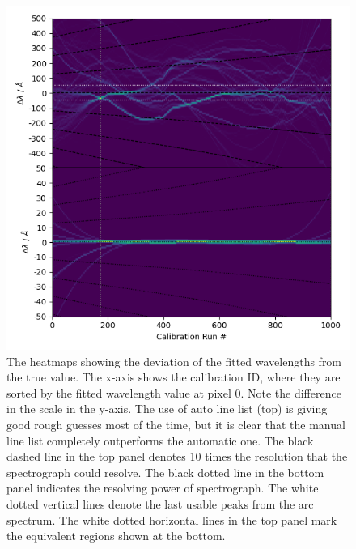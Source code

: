\documentclass[fleqn,usenatbib]{rasti}
\begin{document}
\begin{figure}[h]
    \centering
    \includegraphics[width=\columnwidth]{plots/figure_5_heatmap.png}
    \caption{The heatmaps showing the deviation of the fitted wavelengths from the
    true value. The x-axis shows the calibration ID, where they are sorted by the
    fitted wavelength value at pixel 0. Note the difference in the scale in the y-axis.
    The use of auto line list (top) is giving good rough guesses most of the time,
    but it is clear that the manual line list completely outperforms the automatic
    one. The black dashed line in the top panel denotes 10 times the resolution that
    the spectrograph could resolve. The black dotted line in the bottom panel indicates
    the resolving power of spectrograph. The white dotted vertical lines denote the
    last usable peaks from the arc spectrum. The white dotted horizontal
    lines in the top panel mark the equivalent regions shown at the bottom. }
    \label{fig:heatmap}
\end{figure}
\end{document}
